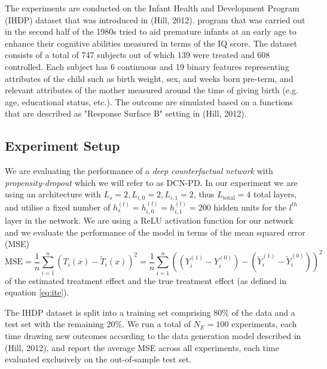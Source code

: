The experiments are conducted on the Infant Health and Development Program (IHDP) dataset that was introduced in (Hill, 2012). %
 program that was carried out in the second half of the 1980s tried to aid premature infants at an early age to enhance their cognitive abilities measured in terms of the IQ score. The dataset consists of a total of 747 subjects out of which 139 were treated and 608 controlled. Each subject has 6 continuous and 19 binary features representing attributes of the child such as birth weight, sex, and weeks born pre-term, and relevant attributes of the mother measured around the time of giving birth (e.g. age, educational status, etc.). The outcome are simulated based on a functions that are described as "Response Surface B" setting in (Hill, 2012). %
 

\subsection{Experiment Setup} \label{sec:pbd-experiment-setup}
We are evaluating the performance of a \emph{deep counterfactual network} with \emph{propensity-dropout} which we will refer to as DCN-PD. In our experiment we are using an architecture with $L_s = 2, L_{i,0} =2 , L_{i,1} = 2$, thus $L_{\text{total}} = 4$ total layers, %
and utilise a fixed number of $h_s^{(l)} = h_{i,0}^{(l)} = h_{i,1}^{(l)} = 200$ hidden units for the $l^{th}$ layer in the network. We are using a ReLU activation function for our network and we evaluate the performance of the model in terms of the mean squared error (MSE)
\begin{equation} \label{eq:mse-ite}
\text{MSE} = \frac{1}{n}\sum_{i=1}^{n} (T_i(x) - \tilde{T}_i(x))^2 = \frac{1}{n}\sum_{i=1}^{n} ((Y_i^{(1)} - Y_i^{(0)}) - (\tilde{Y}_i^{(1)} - \tilde{Y}_i^{(0)}))^2
\end{equation}
 of the estimated treatment effect and the true treatment effect (as defined in equation \ref{eq:ite}).  

The IHDP dataset is split into a training set comprising 80\% of the data and a test set with the remaining 20\%. We run a total of $N_E = 100$ experiments, each time drawing new outcomes according to the data generation model described in (Hill, 2012), %
and report the average MSE across all experiments, each time evaluated exclusively on the out-of-sample test set. 

